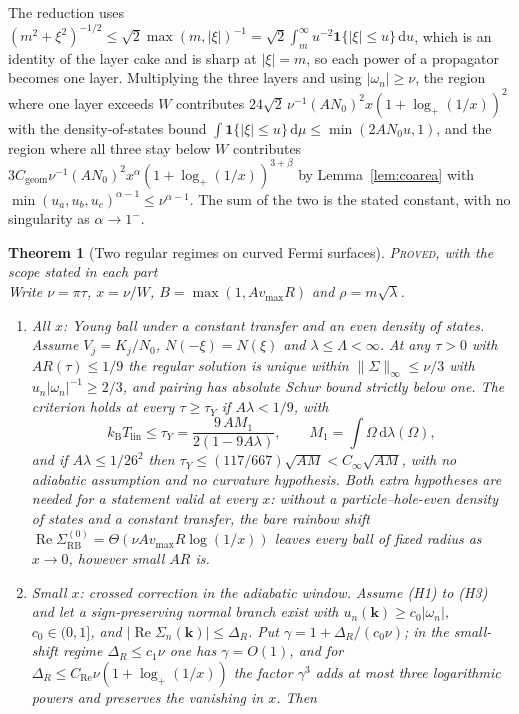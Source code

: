 \documentclass[11pt]{article}
\newcommand{\PROVED}{\upshape\mdseries\textsc{Proved}}
\newcommand{\Cinf}{C_\infty}
\newcommand{\kB}{k_{\mathrm B}}
\newcommand{\Tlin}{T_{\mathrm{lin}}}
\newcommand{\dd}{\,\mathrm d}
\newcommand{\Cgeom}{C_{\mathrm{geom}}}
\newcommand{\vmax}{v_{\max}}
\newtheorem{theorem}{Theorem}[section]
\theoremstyle{definition}
\theoremstyle{remark}
\begin{document}
The reduction uses $(m^2+\xi^2)^{-1/2}\le\sqrt2\max(m,|\xi|)^{-1}=\sqrt2\int_m^\infty u^{-2}\mathbf 1\{|\xi|\le u\}\dd u$, which is an identity of the layer cake and is sharp at $|\xi|=m$, so each power of a propagator becomes one layer. Multiplying the three layers and using $|\omega_n|\ge\nu$, the region where one layer exceeds $W$ contributes $24\sqrt2\,\nu^{-1}(AN_0)^2x(1+\log_+(1/x))^2$ with the density-of-states bound $\int\mathbf 1\{|\xi|\le u\}\dd\mu\le\min(2AN_0u,1)$, and the region where all three stay below $W$ contributes $3\Cgeom\nu^{-1}(AN_0)^2x^\alpha(1+\log_+(1/x))^{3+\beta}$ by Lemma~\ref{lem:coarea} with $\min(u_a,u_b,u_c)^{\alpha-1}\le\nu^{\alpha-1}$. The sum of the two is the stated constant, with no singularity as $\alpha\to1^-$.

\begin{theorem}[Two regular regimes on curved Fermi surfaces]\label{thm:curved}\hfill\PROVED, with the scope stated in each part\\
Write $\nu=\pi\tau$, $x=\nu/W$, $B=\max(1,A\vmax R)$ and $\rho=m\sqrt\lambda$.
\begin{enumerate}
\item[(1)] \emph{All $x$: Young ball under a constant transfer and an even density of states.} Assume $V_j=K_j/N_0$, $N(-\xi)=N(\xi)$ and $\lambda\le\Lambda<\infty$. At any $\tau>0$ with $AR(\tau)\le1/9$ the regular solution is unique within $\|\Sigma\|_\infty\le\nu/3$ with $u_n|\omega_n|^{-1}\ge2/3$, and pairing has absolute Schur bound strictly below one. The criterion holds at every $\tau\ge\tau_Y$ if $A\lambda<1/9$, with
\begin{equation}\label{eq:curvedV3b}
\kB\Tlin\le\tau_Y=\frac{9\,AM_1}{2(1-9A\lambda)},\qquad M_1=\int\Omega\dd\lambda(\Omega),
\end{equation}
and if $A\lambda\le1/26^2$ then $\tau_Y\le(117/667)\sqrt{AM}<\Cinf\sqrt{AM}$, with no adiabatic assumption and no curvature hypothesis. Both extra hypotheses are needed for a statement valid at every $x$: without a particle--hole-even density of states and a constant transfer, the bare rainbow shift $\operatorname{Re}\Sigma^{(0)}_{\mathrm{RB}}=\Theta(\nu A\vmax R\log(1/x))$ leaves every ball of fixed radius as $x\to0$, however small $AR$ is.
\item[(2)] \emph{Small $x$: crossed correction in the adiabatic window.} Assume (H1) to (H3) and let a sign-preserving normal branch exist with $u_n(\mathbf k)\ge c_0|\omega_n|$, $c_0\in(0,1]$, and $|\operatorname{Re}\Sigma_n(\mathbf k)|\le\Delta_R$. Put $\gamma=1+\Delta_R/(c_0\nu)$; in the small-shift regime $\Delta_R\le c_1\nu$ one has $\gamma=O(1)$, and for $\Delta_R\le C_{\mathrm{Re}}\nu(1+\log_+(1/x))$ the factor $\gamma^3$ adds at most three logarithmic powers and preserves the vanishing in $x$. Then

\end{enumerate}
\end{theorem}
\end{document}
